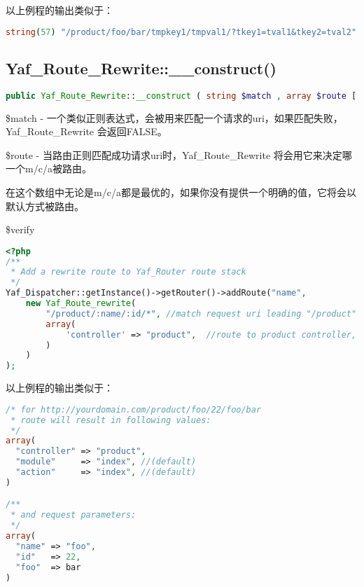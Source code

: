 以上例程的输出类似于：

\begin{lstlisting}[language=PHP]
string(57) "/product/foo/bar/tmpkey1/tmpval1/?tkey1=tval1&tkey2=tval2"
\end{lstlisting}


\subsection{Yaf\_Route\_Rewrite::\_\_construct()}




\begin{lstlisting}[language=PHP]
public Yaf_Route_Rewrite::__construct ( string $match , array $route [, array $verify ] )
\end{lstlisting}

\begin{compactitem}
\item \$match - 一个类似正则表达式，会被用来匹配一个请求的uri，如果匹配失败，Yaf\_Route\_Rewrite 会返回FALSE。

\item \$route - 当路由正则匹配成功请求uri时，Yaf\_Route\_Rewrite 将会用它来决定哪一个m/c/a被路由。

在这个数组中无论是m/c/a都是最优的，如果你没有提供一个明确的值，它将会以默认方式被路由。

\item \$verify
\end{compactitem}


\begin{lstlisting}[language=PHP]
<?php
/**
 * Add a rewrite route to Yaf_Router route stack
 */
Yaf_Dispatcher::getInstance()->getRouter()->addRoute("name",
    new Yaf_Route_rewrite(
        "/product/:name/:id/*", //match request uri leading "/product"
        array(
            'controller' => "product",  //route to product controller,
        )
    )
);
\end{lstlisting}

以上例程的输出类似于：



\begin{lstlisting}[language=PHP]
/* for http://yourdomain.com/product/foo/22/foo/bar
 * route will result in following values:
 */
array(
  "controller" => "product",
  "module"     => "index", //(default)
  "action"     => "index", //(default)
)

/**
 * and request parameters:
 */
array(
  "name" => "foo",
  "id"   => 22,
  "foo"  => bar
)
\end{lstlisting}


